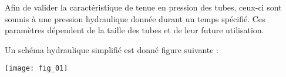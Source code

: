 Afin de valider la caractéristique de tenue en pression des tubes, ceux-ci sont soumis à une pression hydraulique donnée durant un temps spécifié. Ces paramètres dépendent de la taille des tubes et de leur future utilisation.

%
%
Un schéma hydraulique simplifié est donné figure suivante :
\begin{center}
\texttt{[image: fig\_01]}
\end{center}
%
%
%
%
